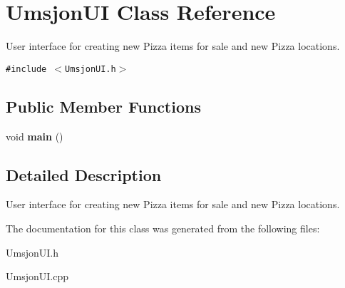 \hypertarget{class_umsjon_u_i}{
\section{Umsjon\-UI Class Reference}
\label{class_umsjon_u_i}
}
User interface for creating new Pizza items for sale and new Pizza locations.  


{\tt \#include $<$Umsjon\-UI.h$>$}

\subsection*{Public Member Functions}
\begin{CompactItemize}
\item 
\hypertarget{class_umsjon_u_i_ea83b916b3f52eec32ae6d54d59b4453}{
void {\bf main} ()}
\label{class_umsjon_u_i_ea83b916b3f52eec32ae6d54d59b4453}

\end{CompactItemize}


\subsection{Detailed Description}
User interface for creating new Pizza items for sale and new Pizza locations. 



The documentation for this class was generated from the following files:\begin{CompactItemize}
\item 
Umsjon\-UI.h\item 
Umsjon\-UI.cpp\end{CompactItemize}

